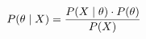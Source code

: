 \documentclass[preview]{standalone}
\begin{document}
\begin{align*}
P(\theta \mid X) = { P(X \mid \theta) \cdot P(\theta) \over P(X) }
\end{align*}
\end{document}
